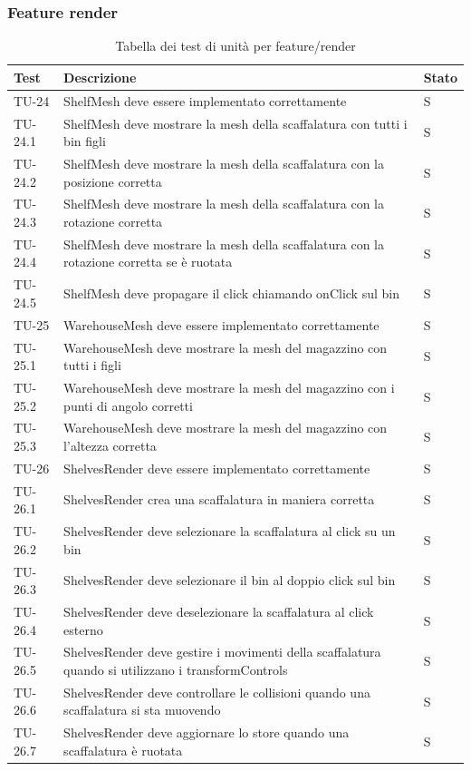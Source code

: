 \subsubsection{Feature render}
\renewcommand{\arraystretch}{1.5}
\begin{xltabular}{0.9\textwidth}{X | p{0.6\textwidth} | p{0.1\textwidth} }
    \textbf{\color{white} Test} & \textbf{\color{white} Descrizione} & \textbf{\color{white} Stato}\\ 
    \hline
    \endhead
    \caption{Tabella dei test di unità per feature/render} 
    \label{tab:test_sistema}
    \endlastfoot

    TU-24 & ShelfMesh deve essere implementato correttamente & S\\
    TU-24.1 & ShelfMesh deve mostrare la mesh della scaffalatura con tutti i bin figli & S\\
    TU-24.2 & ShelfMesh deve mostrare la mesh della scaffalatura con la posizione corretta & S\\
    TU-24.3 & ShelfMesh deve mostrare la mesh della scaffalatura con la rotazione corretta & S\\
    TU-24.4 & ShelfMesh deve mostrare la mesh della scaffalatura con la rotazione corretta se è ruotata & S\\
    TU-24.5 & ShelfMesh deve propagare il click chiamando onClick sul bin & S\\
    
    TU-25 & WarehouseMesh deve essere implementato correttamente & S\\
    TU-25.1 & WarehouseMesh deve mostrare la mesh del magazzino con tutti i figli & S\\
    TU-25.2 & WarehouseMesh deve mostrare la mesh del magazzino con i punti di angolo corretti & S\\
    TU-25.3 & WarehouseMesh deve mostrare la mesh del magazzino con l'altezza corretta & S\\
    
    TU-26 & ShelvesRender deve essere implementato correttamente & S\\
    TU-26.1 & ShelvesRender crea una scaffalatura in maniera corretta & S\\
    TU-26.2 & ShelvesRender deve selezionare la scaffalatura al click su un bin & S\\
    TU-26.3 & ShelvesRender deve selezionare il bin al doppio click sul bin & S\\
    TU-26.4 & ShelvesRender deve deselezionare la scaffalatura al click esterno & S\\
    TU-26.5 & ShelvesRender deve gestire i movimenti della scaffalatura quando si utilizzano i transformControls & S\\
    TU-26.6 & ShelvesRender deve controllare le collisioni quando una scaffalatura si sta muovendo & S\\
    TU-26.7 & ShelvesRender deve aggiornare lo store quando una scaffalatura è ruotata & S\\
    

\end{xltabular}

